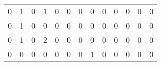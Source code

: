 \begin{tabular}{rrrrrrrrrrrrr}
       0 &       1 &          0 &               1 &                0 &       0 &          0 &          0 &         0 &         0 &      0 &             0 &         0 \\
       0 &       1 &          0 &               0 &                0 &       0 &          0 &          0 &         0 &         0 &      0 &             0 &         0 \\
       0 &       1 &          0 &               2 &                0 &       0 &          0 &          0 &         0 &         0 &      0 &             0 &         0 \\
       0 &       0 &          0 &               0 &                0 &       0 &          0 &          1 &         0 &         0 &      0 &             0 &         0 \\
\bottomrule
\end{tabular}
